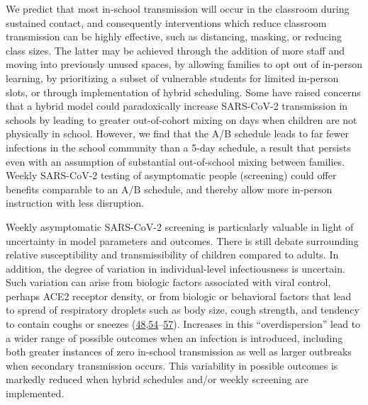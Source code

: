 \documentclass[
]{article}
\begin{document}
We predict that most in-school transmission will occur in the classroom
during sustained contact, and consequently interventions which reduce
classroom transmission can be highly effective, such as distancing,
masking, or reducing class sizes. The latter may be achieved through the
addition of more staff and moving into previously unused spaces, by
allowing families to opt out of in-person learning, by prioritizing a
subset of vulnerable students for limited in-person slots, or through
implementation of hybrid scheduling. Some have raised concerns that a
hybrid model could paradoxically increase SARS-CoV-2 transmission in
schools by leading to greater out-of-cohort mixing on days when children
are not physically in school. However, we find that the A/B schedule
leads to far fewer infections in the school community than a 5-day
schedule, a result that persists even with an assumption of substantial
out-of-school mixing between families. Weekly SARS-CoV-2 testing of
asymptomatic people (screening) could offer benefits comparable to an
A/B schedule, and thereby allow more in-person instruction with less
disruption.

Weekly asymptomatic SARS-CoV-2 screening is particularly valuable in
light of uncertainty in model parameters and outcomes. There is still
debate surrounding relative susceptibility and transmissibility of
children compared to adults. In addition, the degree of variation in
individual-level infectiousness is uncertain. Such variation can arise
from biologic factors associated with viral control, perhaps ACE2
receptor density, or from biologic or behavioral factors that lead to
spread of respiratory droplets such as body size, cough strength, and
tendency to contain coughs or sneezes
(\protect\hyperlink{ref-endo_estimating_2020}{48},\protect\hyperlink{ref-althouse_stochasticity_nodate}{54}--\protect\hyperlink{ref-meyerowitz_transmission_2020}{57}).
Increases in this ``overdispersion'' lead to a wider range of possible
outcomes when an infection is introduced, including both greater
instances of zero in-school transmission as well as larger outbreaks
when secondary transmission occurs. This variability in possible
outcomes is markedly reduced when hybrid schedules and/or weekly
screening are implemented.
\end{document}
